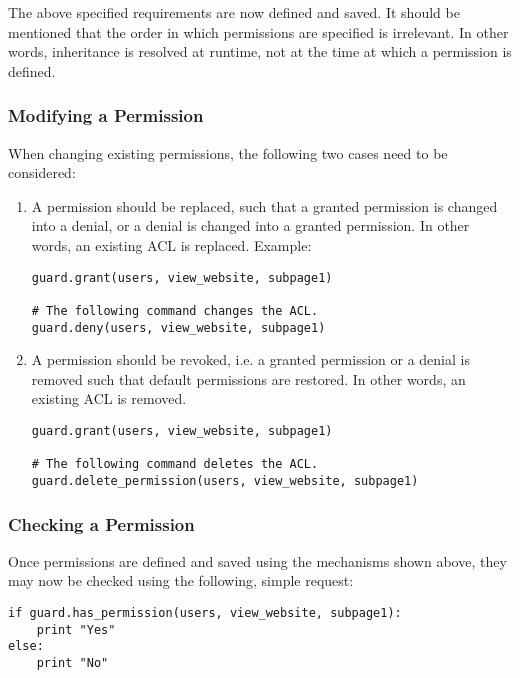 The above specified requirements are now defined and saved. It should be 
mentioned that the order in which permissions are specified is irrelevant. 
In other words, inheritance is resolved at runtime, not at the time at which 
a permission is defined.


\subsubsection{Modifying a Permission}

When changing existing permissions, the following two cases need to 
be considered:

\begin{enumerate}
\item A permission should be replaced, such that a granted permission is 
changed into a denial, or a denial is changed into a granted permission. 
In other words, an existing ACL is replaced. Example:

\begin{lstlisting}
guard.grant(users, view_website, subpage1)

# The following command changes the ACL.
guard.deny(users, view_website, subpage1)
\end{lstlisting}

\item A permission should be revoked, i.e. a granted permission or a 
denial is removed such that default permissions are restored. In other words, 
an existing ACL is removed.

\begin{lstlisting}
guard.grant(users, view_website, subpage1)

# The following command deletes the ACL.
guard.delete_permission(users, view_website, subpage1)
\end{lstlisting}
\end{enumerate}


\subsubsection{Checking a Permission}

Once permissions are defined and saved using the mechanisms shown above, 
they may now be checked using the following, simple request:

\begin{lstlisting}
if guard.has_permission(users, view_website, subpage1):
    print "Yes"
else:
    print "No"
\end{lstlisting}

